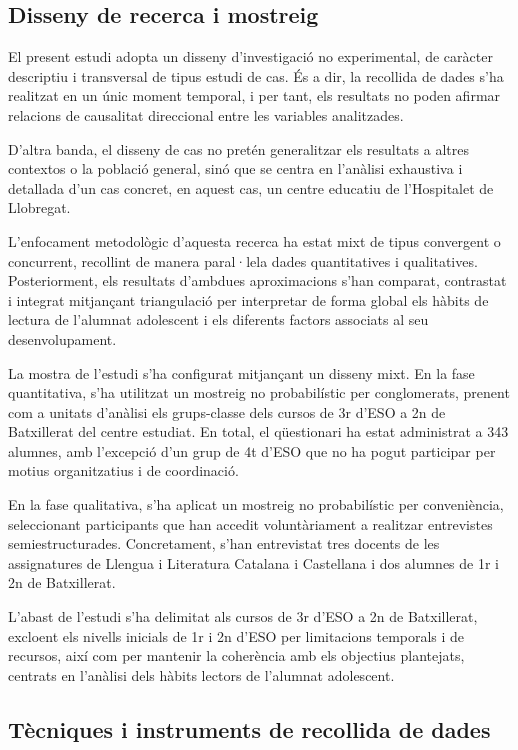 \documentclass[12pt]{article}
\begin{document}
\subsection{Disseny de recerca i mostreig}
El present estudi adopta un disseny d'investigació no experimental, de caràcter descriptiu i transversal de tipus estudi de cas. És a dir, la recollida de dades s'ha realitzat en un únic moment temporal, i per tant, els resultats no poden afirmar relacions de causalitat direccional entre les variables analitzades.

D'altra banda, el disseny de cas no pretén generalitzar els resultats a altres contextos o la població general, sinó que se centra en l'anàlisi exhaustiva i detallada d'un cas concret, en aquest cas, un centre educatiu de l'Hospitalet de Llobregat.

L’enfocament metodològic d'aquesta recerca ha estat mixt de tipus convergent o concurrent, recollint de manera paral·lela dades quantitatives i qualitatives. Posteriorment, els resultats d'ambdues aproximacions s'han comparat, contrastat i integrat mitjançant triangulació per interpretar de forma global els hàbits de lectura de l'alumnat adolescent i els diferents factors associats al seu desenvolupament.

La mostra de l’estudi s’ha configurat mitjançant un disseny mixt. En la fase quantitativa, s’ha utilitzat un mostreig no probabilístic per conglomerats, prenent com a unitats d’anàlisi els grups-classe dels cursos de 3r d’ESO a 2n de Batxillerat del centre estudiat. En total, el qüestionari ha estat administrat a 343 alumnes, amb l’excepció d’un grup de 4t d’ESO que no ha pogut participar per motius organitzatius i de coordinació.

En la fase qualitativa, s’ha aplicat un mostreig no probabilístic per conveniència, seleccionant participants que han accedit voluntàriament a realitzar entrevistes semiestructurades. Concretament, s’han entrevistat tres docents de les assignatures de Llengua i Literatura Catalana i Castellana i dos alumnes de 1r i 2n de Batxillerat.

L’abast de l’estudi s’ha delimitat als cursos de 3r d’ESO a 2n de Batxillerat, excloent els nivells inicials de 1r i 2n d'ESO per limitacions temporals i de recursos, així com per mantenir la coherència amb els objectius plantejats, centrats en l'anàlisi dels hàbits lectors de l'alumnat adolescent.

\subsection{Tècniques i instruments de recollida de dades}
\end{document}
